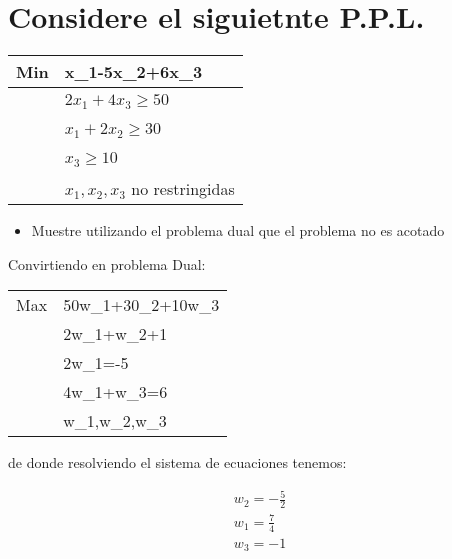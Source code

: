 \section{Considere el siguietnte P.P.L.}
    \begin{tabular}{|l|l|}
    \hline
    Min & x_1-5x_2+6x_3 \\ \hline
        ~ & $2x_1+4x_3\geq 50$ \\ \hline
        ~ & $x_1+2x_2\geq 30$ \\ \hline
        ~ & $x_3\geq 10$ \\ \hline
        ~ & $x_1,x_2,x_3$ no restringidas \\ \hline
    \end{tabular}
    \begin{itemize}
        \item Muestre utilizando el problema dual que el problema no es acotado
    \end{itemize}
    
    Convirtiendo en problema Dual:
    
    \begin{tabular}{ll}
Max & 50w_1+30_2+10w_3                 \\
    & 2w_1+w_2+1                        \\
    & 2w_1=-5                            \\
    & 4w_1+w_3=6                        \\
    & w_1,w_2,w_3\geq 0
\end{tabular}

de donde resolviendo el sistema de ecuaciones tenemos:

\begin{align}
    w_2=-\frac{5}{2}\\
    w_1=\frac{7}{4}\\
    w_3=-1
\end{align}

